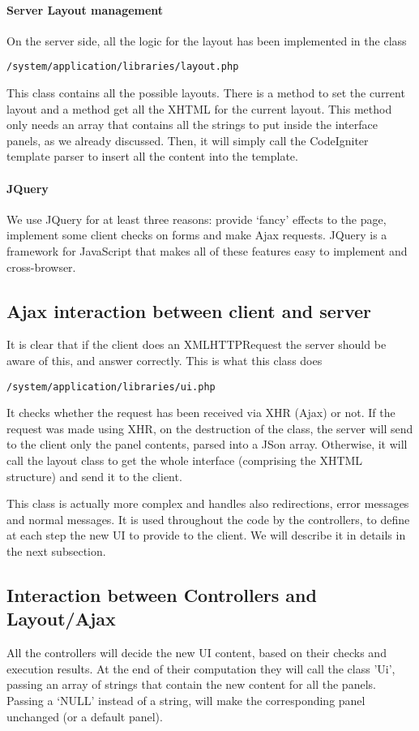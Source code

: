 \paragraph{Server Layout management}
On the server side, all the logic for the layout has been implemented in the class \begin{verbatim}/system/application/libraries/layout.php
\end{verbatim}
This class contains all the possible layouts. There is a method to set the current layout and a method get all the XHTML for the current layout. This method only needs an array that contains all the strings to put inside the interface panels, as we already discussed. Then, it will simply call the CodeIgniter template parser to insert all the content into the template.

\paragraph{JQuery}
We use JQuery for at least three reasons: provide `fancy' effects to the page, implement some client checks on forms and make Ajax requests. JQuery is a framework for JavaScript that makes all of these features easy to implement and cross-browser.

\subsection{Ajax interaction between client and server}
It is clear that if the client does an XMLHTTPRequest the server should be aware of this, and answer correctly. This is what this class does
\begin{verbatim}/system/application/libraries/ui.php
\end{verbatim}
It checks whether the request has been received via XHR (Ajax) or not. If the request was made using XHR, on the destruction of the class, the server will send to the client only the panel contents, parsed into a JSon array. Otherwise, it will call the layout class to get the whole interface (comprising the XHTML structure) and send it to the client.

This class is actually more complex and handles also redirections, error messages and normal messages. It is used throughout the code by the controllers, to define at each step the new UI to provide to the client. We will describe it in details in the next subsection.

\subsection{Interaction between Controllers and Layout/Ajax}
All the controllers will decide the new UI content, based on their checks and execution results. At the end of their computation they will call the class 'Ui', passing an array of strings that contain the new content for all the panels. Passing a `NULL' instead of a string, will make the corresponding panel unchanged (or a default panel).

